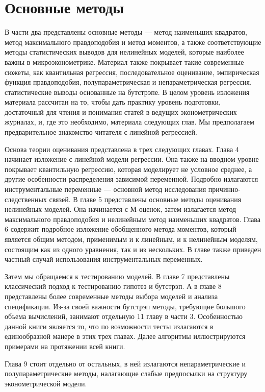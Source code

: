 \part{Основные методы}

В части два представлены основные методы --- метод наименьших квадратов, метод максимального правдоподобия и метод моментов, а также соответствующие методы статистических выводов для нелинейных моделей, которые наиболее важны в микроэконометрике. Материал также покрывает такие современные сюжеты, как квантильная регрессия, последовательное оценивание, эмпирическая функция правдоподобия, полупараметрическая и непараметрическая регрессия, статистические выводы основанные на бутстрэпе. В целом уровень изложения материала рассчитан на то, чтобы дать практику уровень подготовки, достаточный для чтения и понимания статей в ведущих эконометрических журналах, и, где это необходимо, материала следующих глав. Мы предполагаем предварительное знакомство читателя с линейной регрессией.

Основа теории оценивания представлена в трех следующих главах. Глава 4 начинает изложение с линейной модели регрессии. Она также на вводном уровне покрывает квантильную регрессию, которая моделирует не условное среднее, а другие особенности распределения зависимой переменной. Подробно излагаются инструментальные переменные --- основной метод исследования причинно-следственных связей. В главе 5 представлены основные методы оценивания нелинейных моделей. Она начинается с М-оценок, затем излагается метод максимального правдоподобия и нелинейным метод наименьших квадратов. Глава 6 содержит подробное изложение обобщенного метода моментов, который является общим методом, применимым и к линейным, и к нелинейным моделям, состоящим как из одного уравнения, так и из нескольких. В главе также приведен частный случай использования инструментальных переменных.

Затем мы обращаемся к тестированию моделей. В главе 7 представлены классический подход к тестированию гипотез и бутстрэп. А в главе 8 представлены более современные методы выбора моделей и анализа спецификации. Из-за своей важности бутстрэп методы, требующие большого объема вычислений, занимают отдельную 11 главу в части 3. Особенностью данной книги является то, что по возможности тесты излагаются в единообразной манере в этих трех главах. Далее алгоритмы иллюстрируются примерами на протяжении всей книги. 

Глава 9 стоит отдельно от остальных, в ней излагаются непараметрические и полупараметрические методы, налагающие слабые предпосылки на структуру эконометрической модели.


